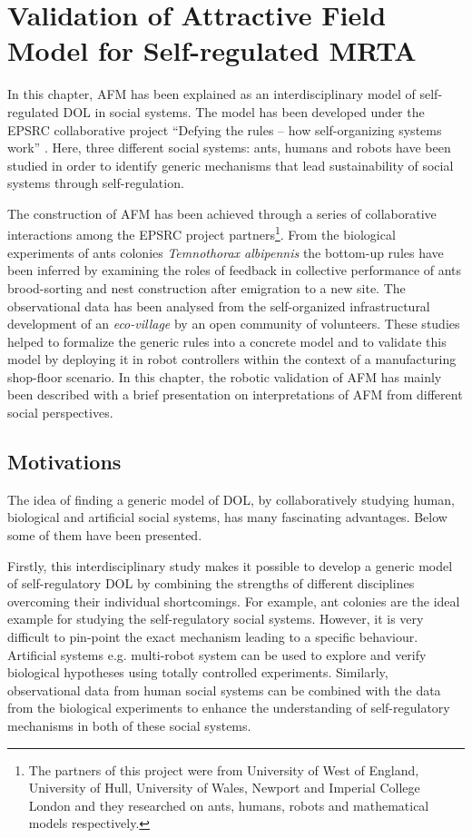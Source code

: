 \chapter{Validation of Attractive Field Model for Self-regulated MRTA}
\label{afm}
In this chapter,  AFM  has been explained as an interdisciplinary model of self-regulated DOL in social systems. The model has been developed under the EPSRC collaborative project ``Defying the rules – how self-organizing systems work'' \cite{Arcaute+2008}. Here,  three different social systems: ants, humans and robots have been studied in order to identify generic mechanisms that lead sustainability of social systems through self-regulation.

The construction of AFM has been achieved through a series of collaborative interactions among the EPSRC project partners\footnote{The partners of this project were from University of West of England, University of Hull, University of Wales, Newport and Imperial College London and they researched on ants, humans, robots and mathematical models respectively.}. From the biological experiments of ants colonies {\em Temnothorax albipennis} the bottom-up rules have been inferred by examining the roles of feedback in collective performance of ants brood-sorting and nest construction after emigration to a new site. The observational data has been analysed from the self-organized infrastructural development of an {\em eco-village} by an open community of volunteers. These studies helped  to formalize the generic rules into a concrete model  and to validate this model by deploying it in robot controllers within the context of a manufacturing shop-floor scenario. In this chapter, the robotic validation of AFM has mainly been described with a brief presentation on interpretations of AFM from different social perspectives.
\section{Motivations}
\label{afm:motivations}
The idea of finding a generic model of DOL, by collaboratively  studying human, biological and artificial social systems, has many fascinating advantages. Below some of them have been presented.

Firstly, this interdisciplinary study makes it possible to develop a generic model of self-regulatory DOL by combining the strengths of different disciplines overcoming their individual shortcomings. For example, ant colonies are the ideal example for studying the self-regulatory social systems. However, it is very difficult to pin-point the exact mechanism leading to a specific behaviour. Artificial systems e.g.  multi-robot system can be used to explore and verify biological hypotheses using totally controlled experiments. Similarly, observational data from human social systems can be combined with the data from the biological experiments to enhance the understanding of self-regulatory mechanisms in both of these social systems.
 
